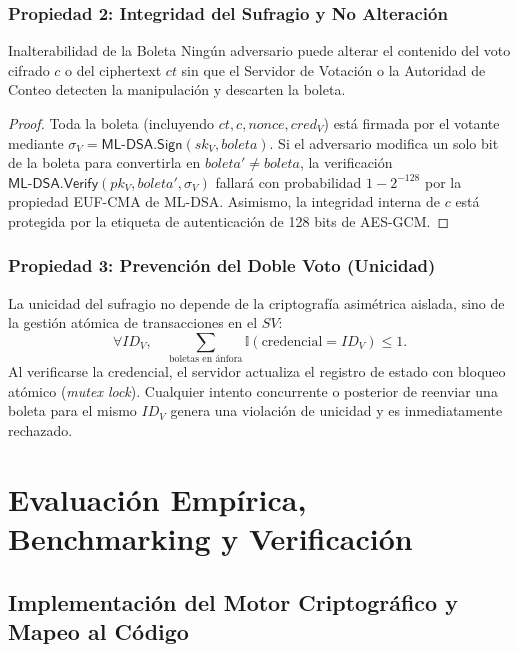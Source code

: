 \documentclass[11pt,a4paper,twoside,openright]{book}
\theoremstyle{plain}
\theoremstyle{definition}
\theoremstyle{remark}
\newcommand{\MLDSA}{\textsf{ML-DSA}}
\newcommand{\Sign}{\mathsf{Sign}}
\newcommand{\Verify}{\mathsf{Verify}}
\begin{document}
\section{Propiedad 2: Integridad del Sufragio y No Alteraci\'on}

\begin{miteo}{Inalterabilidad de la Boleta}
Ning\'un adversario puede alterar el contenido del voto cifrado $c$ o del ciphertext $ct$ sin que el Servidor de Votaci\'on o la Autoridad de Conteo detecten la manipulaci\'on y descarten la boleta.
\end{miteo}
\begin{proof}
Toda la boleta (incluyendo $ct, c, \mathit{nonce}, \mathit{cred}_V$) est\'a firmada por el votante mediante $\sigma_V = \MLDSA.\Sign(sk_V, \mathit{boleta})$. Si el adversario modifica un solo bit de la boleta para convertirla en $\mathit{boleta}' \neq \mathit{boleta}$, la verificaci\'on $\MLDSA.\Verify(pk_V, \mathit{boleta}', \sigma_V)$ fallar\'a con probabilidad $1 - 2^{-128}$ por la propiedad EUF-CMA de \MLDSA{}. Asimismo, la integridad interna de $c$ est\'a protegida por la etiqueta de autenticaci\'on de 128 bits de AES-GCM.
\end{proof}

\section{Propiedad 3: Prevenci\'on del Doble Voto (Unicidad)}

La unicidad del sufragio no depende de la criptograf\'ia asim\'etrica aislada, sino de la gesti\'on at\'omica de transacciones en el $SV$:
\[
  \forall ID_V, \quad \sum_{\text{boletas en \'anfora}} \mathbb{I}(\text{credencial} = ID_V) \leq 1.
\]
Al verificarse la credencial, el servidor actualiza el registro de estado con bloqueo at\'omico (\emph{mutex lock}). Cualquier intento concurrente o posterior de reenviar una boleta para el mismo $ID_V$ genera una violaci\'on de unicidad y es inmediatamente rechazado.

\part{Evaluaci\'on Emp\'irica, Benchmarking y Verificaci\'on}

\chapter{Implementaci\'on del Motor Criptogr\'afico y Mapeo al C\'odigo}
\label{chap:implementacion_codigo}
\end{document}
